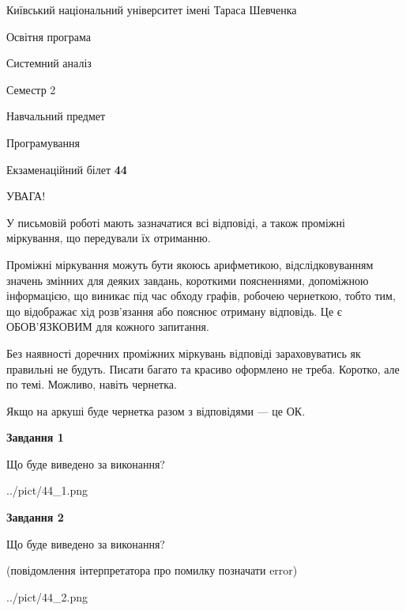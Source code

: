 \documentclass[12pt, ukrainian]{article}
\begin{document}
{{\begin {small}\par
{ \center  Київський національний університет імені Тараса Шевченка \par}
{\parbox {5 cm}{Освітня програма \hfill}{\parbox {7 cm}{Системний аналіз \hfill}}\parbox {6 cm}{\hfill Семестр 2}}\par
{\parbox {5 cm} {Навчальний предмет \hfill}\parbox {7 cm}{Програмування \hfill}\parbox {6cm}{\hfill}\par}\vspace{-7pt} \end{small}}{\center Екзаменаційний білет \No \textbf
{ 44 }\par}}
{
\begin {large}
УВАГА!

У письмовій роботі мають зазначатися всі відповіді, а також проміжні міркування, що передували їх отриманню.

Проміжні міркування можуть бути якоюсь арифметикою, відслідковуванням зна\-чень змінних для деяких завдань,
короткими поясненнями, допоміжною інформацією, що виникає під час обходу графів, робочею чернеткою,
тобто тим, що відображає хід розв’язання або пояснює отриману відповідь.
Це є ОБОВ’ЯЗКОВИМ для кожного запитання.

Без наявності доречних проміжних міркувань відповіді зараховуватись як правиль\-ні не будуть.
Писати багато та красиво оформлено не треба. Коротко, але по темі. Можли\-во, навіть чернетка.

Якщо на аркуші буде чернетка разом з відповідями --- це ОК.

\newpage

{\begin {center}\textbf{Завдання 1}\end {center}}\par
Що буде виведено за виконання?\par
\begin{center}
	{../pict/44_1.png}
\end{center}
\newpage

{\begin {center}\textbf{Завдання 2}\end {center}}\par
Що буде виведено за виконання?\par
 (повідомлення інтерпретатора про помилку позначати error)\par
\begin{center}
	{../pict/44_2.png}
\end{center}
\newpage


\end{large}}
\end{document}

